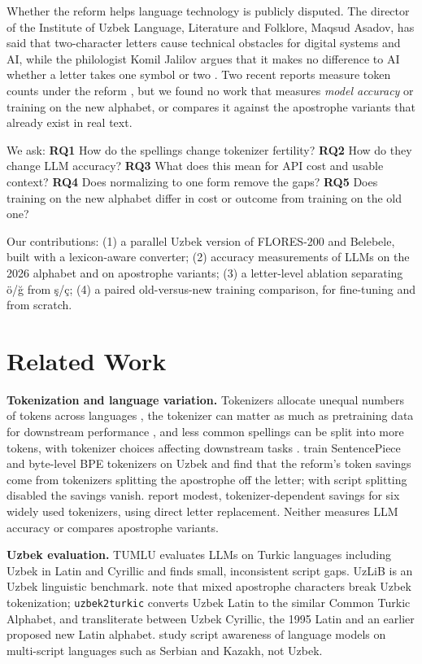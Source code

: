 Whether the reform helps language technology is publicly disputed. The director of the Institute of Uzbek Language, Literature and Folklore, Maqsud Asadov, has said that two-character letters cause technical obstacles for digital systems and AI, while the philologist Komil Jalilov argues that it makes no difference to AI whether a letter takes one symbol or two \citep{sobirov2026}. Two recent reports measure token counts under the reform \citep{rozimatov2026, ibadullaev2026}, but we found no work that measures \emph{model accuracy} or training on the new alphabet, or compares it against the apostrophe variants that already exist in real text.

We ask: \textbf{RQ1} How do the spellings change tokenizer fertility? \textbf{RQ2} How do they change LLM accuracy? \textbf{RQ3} What does this mean for API cost and usable context? \textbf{RQ4} Does normalizing to one form remove the gaps? \textbf{RQ5} Does training on the new alphabet differ in cost or outcome from training on the old one?

Our contributions: (1) a parallel Uzbek version of FLORES-200 and Belebele, built with a lexicon-aware converter; (2) accuracy measurements of LLMs on the 2026 alphabet and on apostrophe variants; (3) a letter-level ablation separating \"o/\u{g} from \c{s}/\c{c}; (4) a paired old-versus-new training comparison, for fine-tuning and from scratch.

\section{Related Work}
\textbf{Tokenization and language variation.} Tokenizers allocate unequal numbers of tokens across languages \citep{petrov2023}, the tokenizer can matter as much as pretraining data for downstream performance \citep{rust2021}, and less common spellings can be split into more tokens, with tokenizer choices affecting downstream tasks \citep{wegmann2025}. \citet{ibadullaev2026} train SentencePiece and byte-level BPE tokenizers on Uzbek and find that the reform's token savings come from tokenizers splitting the apostrophe off the letter; with script splitting disabled the savings vanish. \citet{rozimatov2026} report modest, tokenizer-dependent savings for six widely used tokenizers, using direct letter replacement. Neither measures LLM accuracy or compares apostrophe variants.

\textbf{Uzbek evaluation.} TUMLU \citep{isbarov2025} evaluates LLMs on Turkic languages including Uzbek in Latin and Cyrillic and finds small, inconsistent script gaps. UzLiB \citep{shopulatov2025} is an Uzbek linguistic benchmark. \citet{sharipov2023uzbektagger} note that mixed apostrophe characters break Uzbek tokenization; \texttt{uzbek2turkic} \citep{sharipov2026uzbek2turkic} converts Uzbek Latin to the similar Common Turkic Alphabet, and \citet{salaev2022} transliterate between Uzbek Cyrillic, the 1995 Latin and an earlier proposed new Latin alphabet. \citet{kletz2026} study script awareness of language models on multi-script languages such as Serbian and Kazakh, not Uzbek.

